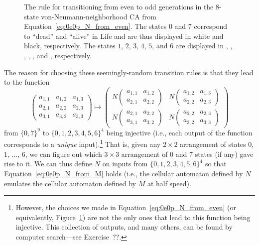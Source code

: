 \begin{figure}[!htb]
	\caption{The rule for transitioning from even to odd generations in the $8$-state von-Neumann-neighborhood CA from Equation~\eqref{eq:0e0p_N_from_even}. The states $0$ and $7$ correspond to ``dead'' and ``alive'' in Life and are thus displayed in white and black, respectively. The states $1$, $2$, $3$, $4$, $5$, and $6$ are displayed in , , , , , and , respectively.}\label{fig:0e0p_rule_em}
\end{figure}

The reason for choosing these seemingly-random transition rules is that they lead to the function
\[
	\begin{pmatrix}
		a_{1,1} & a_{1,2} & a_{1,3} \\
		a_{2,1} & a_{2,2} & a_{2,3} \\
		a_{3,1} & a_{3,2} & a_{3,3}
	\end{pmatrix} \mapsto \begin{pmatrix}
		N\begin{pmatrix}
		a_{1,1} & a_{1,2} \\
		a_{2,1} & a_{2,2}
		\end{pmatrix} & N\begin{pmatrix}
		a_{1,2} & a_{1,3} \\
		a_{2,2} & a_{2,3}
		\end{pmatrix} \\
		N\begin{pmatrix}
		a_{2,1} & a_{2,2} \\
		a_{3,1} & a_{3,2}
		\end{pmatrix} & N\begin{pmatrix}
		a_{2,2} & a_{2,3} \\
		a_{3,2} & a_{3,3}
		\end{pmatrix}
	\end{pmatrix}
\]
from $\{0,7\}^9$ to $\{0,1,2,3,4,5,6\}^4$ being injective (i.e., each output of the function corresponds to a \emph{unique} input).\footnote{However, the choices we made in Equation~\eqref{eq:0e0p_N_from_even} (or equivalently, Figure~\ref{fig:0e0p_rule_em}) are not the only ones that lead to this function being injective. This collection of outputs, and many others, can be found by computer search---see Exercise~??.} That is, given any $2 \times 2$ arrangement of states $0$, $1$, $\ldots$, $6$, we can figure out which $3 \times 3$ arrangement of $0$ and $7$ states (if any) gave rise to it. We can thus define $N$ on inputs from $\{0,1,2,3,4,5,6\}^4$ so that Equation~\eqref{eq:0e0p_N_from_M} holds (i.e., the cellular automaton defined by $N$ emulates the cellular automaton defined by $M$ at half speed).

